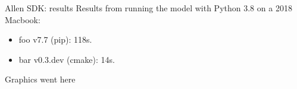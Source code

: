 \documentclass[aspectratio=43]{beamer}
\begin{document}


\begin{frame}[fragile]{Allen SDK: results}
    \vfill
    Results from running the model with Python 3.8 on a 2018 Macbook:
    \begin{itemize}
        \item foo v7.7 (pip): 118s.
        \item bar v0.3.dev (cmake): 14s.
    \end{itemize}

    \vspace{-15pt}

    \begin{center}
    Graphics went here
    \end{center}

\end{frame}
\end{document}

